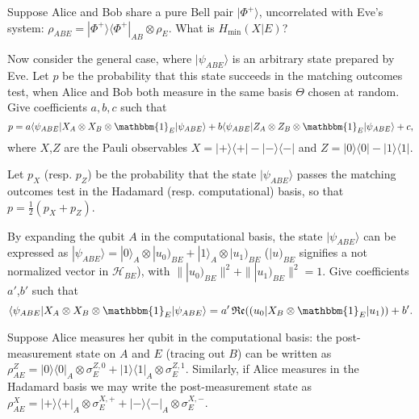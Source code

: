 \documentclass[a4paper,10pt,landscape,twocolumn]{scrartcl}
\begin{document}
\begin{exercise}
\begin{subex}[Problem 1]
Suppose Alice and Bob share a pure Bell pair $|\Phi ^+\rangle$, uncorrelated with Eve's system: $\rho _{ABE} = |\Phi ^+\rangle \langle \Phi ^+|_{AB} \otimes \rho _ E$. What is $H_{\min}(X|E)$? 
\end{subex}
\begin{subex}[Problem 2]
 Now consider the general case, where $|\psi _{ABE}\rangle$ is an arbitrary state prepared by Eve. Let $p$ be the probability that this state succeeds in the matching outcomes test, when Alice and Bob both measure in the same basis $\Theta$ chosen at random. Give coefficients $a,b,c$ such that
\begin{equation}
p = a \langle \psi _{ABE}| X_ A \otimes X_ B \otimes \mathbbm{1}_ E |\psi _{ABE}\rangle + b\langle \psi _{ABE}| Z_ A \otimes Z_ B \otimes \mathbbm{1}_ E |\psi _{ABE}\rangle + c,
\end{equation}
where $X$,$Z$ are the Pauli observables $X = |+\rangle \langle +| - |-\rangle \langle -|$ and $Z = |0\rangle \langle 0| - |1\rangle \langle 1|$. 
\end{subex}
\begin{subex}[Problem 3]
 Let $p_ X$ (resp. $p_ Z$) be the probability that the state $|\psi _{ABE}\rangle$ passes the matching outcomes test in the Hadamard (resp. computational) basis, so that $p=\frac{1}{2}(p_ X+p_ Z)$.

By expanding the qubit $A$ in the computational basis, the state $|\psi _{ABE}\rangle$ can be expressed as $|\psi _{ABE}\rangle = |0\rangle _ A\otimes |u_0)_{BE} + |1\rangle _ A\otimes |u_1) _{BE}$ ($|u)_{BE}$ signifies a not normalized vector in $\mathcal{H}_{BE}$), with $\| |u_0) _{BE}\|^2+\| |u_1)_{BE}\|^2=1$. Give coefficients $a'$,$b'$ such that
\begin{equation}
\langle \psi _{ABE}| X_ A \otimes X_ B \otimes \mathbbm{1}_ E |\psi _{ABE}\rangle = a'\, \mathfrak{Re} (( u_0| X_ B \otimes \mathbbm{1}_ E |u_1) ) + b'.
\end{equation}

\end{subex}

\begin{subex}[Problem 4]
 Suppose Alice measures her qubit in the computational basis: the post-measurement state on $A$ and $E$ (tracing out $B$) can be written as $\rho _{AE}^ Z = |0\rangle \langle 0|_ A\otimes \sigma _ E^{Z,0} + |1\rangle \langle 1|_ A\otimes \sigma _ E^{Z,1}$. Similarly, if Alice measures in the Hadamard basis we may write the post-measurement state as $\rho _{AE}^ X = |+\rangle \langle +|_ A\otimes \sigma _ E^{X,+} + |-\rangle \langle -|_ A\otimes \sigma _ E^{X,-}$.


\end{subex}
\end{exercise}
\end{document}
